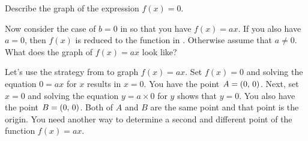 \documentclass[a4paper,oneside,12pt]{article}
\begin{document}

\begin{exercise}
\label{ex:constant_function_zero}
Describe the graph of the expression $f(x) = 0$.
\end{exercise}


Now consider the case of $b = 0$ in
 so that you have
$f(x) = ax$.  If you also have $a = 0$, then $f(x)$ is reduced to the
function in .  Otherwise assume
that $a \neq 0$.  What does the graph of $f(x) = ax$ look like?

Let's use the strategy from  to graph
$f(x) = ax$.  Set $f(x) = 0$ and solving the equation $0 = ax$ for $x$
results in $x = 0$.  You have the point $A = \left\lparen{0},\, {0}\right\rparen$.  Next, set
$x = 0$ and solving the equation $y = a \times 0$ for $y$ shows that
$y = 0$.  You also have the point $B = \left\lparen{0},\, {0}\right\rparen$.  Both of $A$ and
$B$ are the same point and that point is the origin.  You need another
way to determine a second and different point of the function
$f(x) = ax$.
\end{document}
